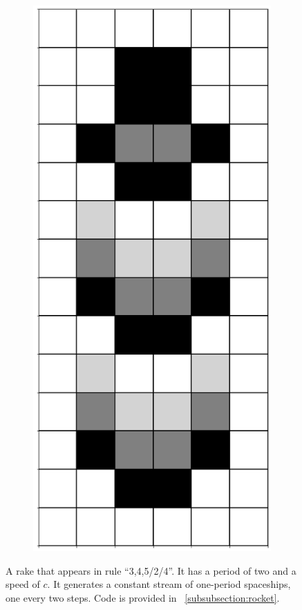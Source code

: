 \documentclass[12pt]{article}
\numberwithin{figure}{section} %
\begin{document}
\begin{figure}[H]
\begin{subfigure}{0.18\textwidth}
     		\subcaption{}
   	\end{subfigure}
	\begin{subfigure}{0.18\textwidth}
     		\centering
     		\includegraphics[width=\linewidth]{Section4/34.4}
     		\subcaption{}
   	\end{subfigure}
   	\caption[A rocket spaceship]{A rake that appears in rule “3,4,5/2/4”. It has a period of two and a speed of $c$. It generates a constant stream of one-period spaceships, one every two steps. Code is provided in ~\ref{subsubsection:rocket}.}
   	\label{fig:rocket}
      	\vspace{-1.5em}
\end{figure}
\end{document}
